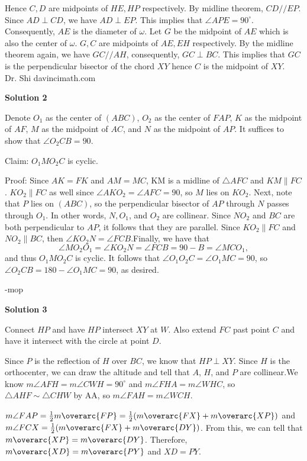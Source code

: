 \begin{enumerate}
 Hence $C, D$ are midpoints of $HE, HP$ respectively. By midline theorem, $CD // EP$. Since $AD \perp CD$, we have $AD \perp EP$. This implies that $\angle APE = 90^{\circ}$. Consequently, $AE$ is the diameter of $\omega$. Let $G$ be the midpoint of $AE$ which is also the center of $\omega$. $G,C$ are midpoints of $AE, EH$ respectively. By the midline theorem again, we have $GC//AH$, consequently, $GC \perp BC$. This implies that $GC$ is the perpendicular bisector of the chord $XY$ hence $C$ is the midpoint of $XY$.    ~ Dr. Shi davincimath.com

 



\textbf{Solution 2}

Denote $O_1$ as the center of $(ABC)$, $O_2$ as the center of $FAP$, $K$ as the midpoint of $AF$, $M$ as the midpoint of $AC$, and $N$ as the midpoint of $AP$. It suffices to show that $\angle{O_2CB}=90$.

 Claim: $O_1MO_2C$ is cyclic. 

 Proof: Since $AK=FK$ and $AM=MC$, KM is a midline of $\triangle{AFC}$ and $KM\parallel FC$. $KO_2\parallel FC$ as well since $\angle{AKO_2}=\angle{AFC}=90$, so $M$ lies on $KO_2$. Next, note that $P$ lies on $(ABC)$, so the perpendicular bisector of $AP$ through $N$ passes through $O_1$. In other words, $N, O_1$, and $O_2$ are collinear. Since $NO_2$ and $BC$ are both perpendicular to $AP$, it follows that they are parallel. Since $KO_2\parallel FC$ and $NO_2\parallel BC$, then $\angle KO_2N=\angle{FCB}$.Finally, we have that 
 \[\angle{MO_2O_1}=\angle{KO_2N}=\angle{FCB}=90-B=\angle{MCO_1},\]and thus $O_1MO_2C$ is cyclic. It follows that $\angle O_1O_2C=\angle{O_1MC}=90$, so $\angle{O_2CB}=180-\angle{O_1MC}=90$, as desired.

 -mop

 



\textbf{Solution 3}

Connect $HP$ and have $HP$ intersect $XY$ at $W$. Also extend $FC$ past point $C$ and have it intersect with the circle at point $D$.

 Since $P$ is the reflection of $H$ over $BC$, we know that $HP\perp XY$. Since $H$ is the orthocenter, we can draw the altitude and tell that $A$, $H$, and $P$ are collinear.We know $m\angle{AFH} = m\angle{CWH}=90^{\circ}$ and $m\angle{FHA} = m\angle{WHC}$, so $\triangle{AHF} \sim \triangle{CHW}$ by AA, so $m\angle{FAH} = m\angle{WCH}$.

 $m\angle{FAP} = \frac{1}{2}m\overarc{FP} = \frac{1}{2}(m\overarc{FX} + m\overarc{XP})$ and $m\angle{FCX} = \frac{1}{2}(m\overarc{FX} + m\overarc{DY})$. From this, we can tell that $m\overarc{XP} = m\overarc{DY}$. Therefore, $m\overarc{XD} = m\overarc{PY}$ and $XD = PY$.


\end{enumerate}
